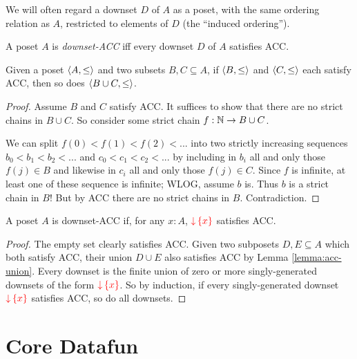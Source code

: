 \documentclass{article}
\begin{document}
We will often regard a downset $D$ of $A$ as a poset, with the same ordering
relation as $A$, restricted to elements of $D$ (the ``induced ordering'').

\begin{definition}
  A poset $A$ is \emph{downset-ACC} iff every downset $D$ of $A$ satisfies
  ACC.
\end{definition}

\begin{lemma}\label{lemma:acc-union}
  Given a poset $\langle{A,\le}\rangle$ and two subsets $B,C \subseteq A$, if
  $\langle{B,\le}\rangle$ and $\langle{C,\le}\rangle$ each satisfy ACC, then so does $\langle{B
    \cup C, \le}\rangle$.
\end{lemma}
\begin{proof}
  Assume $B$ and $C$ satisfy ACC.
  It suffices to show that there are no strict chains in $B \cup C$.
  So consider some strict chain $f : \mathbb{N} \to B \cup C$.

  We can split $f(0) < f(1) < f(2) < ...$ into two strictly increasing sequences
  $b_0 < b_1 < b_2 < ...$ and $c_0 < c_1 < c_2 < ...$ by including in $b_i$ all
  and only those $f(j) \in B$ and likewise in $c_i$ all and only those $f(j) \in
  C$. Since $f$ is infinite, at least one of these sequence is infinite; WLOG,
  assume $b$ is. Thus $b$ is a strict chain in $B$! But by ACC there are no
  strict chains in $B$. Contradiction.
\end{proof}

\begin{theorem}
  A poset $A$ is downset-ACC if, for any $x : A$, $\downintro{x}$ satisfies ACC.
\end{theorem}
\begin{proof}
  The empty set clearly satisfies ACC. Given two subposets $D,E \subseteq A$
  which both satisfy ACC, their union $D \cup E$ also satisfies ACC by Lemma
  \ref{lemma:acc-union}. Every downset is the finite union of zero or more
  singly-generated downsets of the form $\downintro{x}$. So by induction, if
  every singly-generated downset $\downintro{x}$ satisfies ACC, so do all
  downsets.
\end{proof}



\section{Core Datafun}
\end{document}
